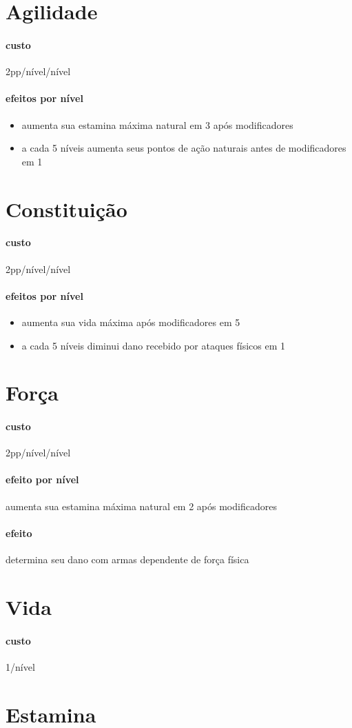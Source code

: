 \section{Agilidade}
\paragraph{custo} 2pp/nível/nível
\paragraph{efeitos por nível} 
\begin{itemize}
  \item aumenta sua estamina máxima natural em 3 após modificadores
  \item a cada 5 níveis aumenta seus pontos de ação naturais antes de modificadores em 1
\end{itemize}
%
\section{Constituição}
\paragraph{custo} 2pp/nível/nível
\paragraph{efeitos por nível} 
\begin{itemize}
  \item aumenta sua vida máxima após modificadores em 5
  \item a cada 5 níveis diminui dano recebido por ataques físicos em 1 
\end{itemize}
%
\section{Força}
\paragraph{custo} 2pp/nível/nível
\paragraph{efeito por nível} aumenta sua estamina máxima natural em 2 após modificadores
\paragraph{efeito} determina seu dano com armas dependente de força física
%
\section{Vida}
\paragraph{custo} 1/nível
%
\section{Estamina}
\paragraph{}
